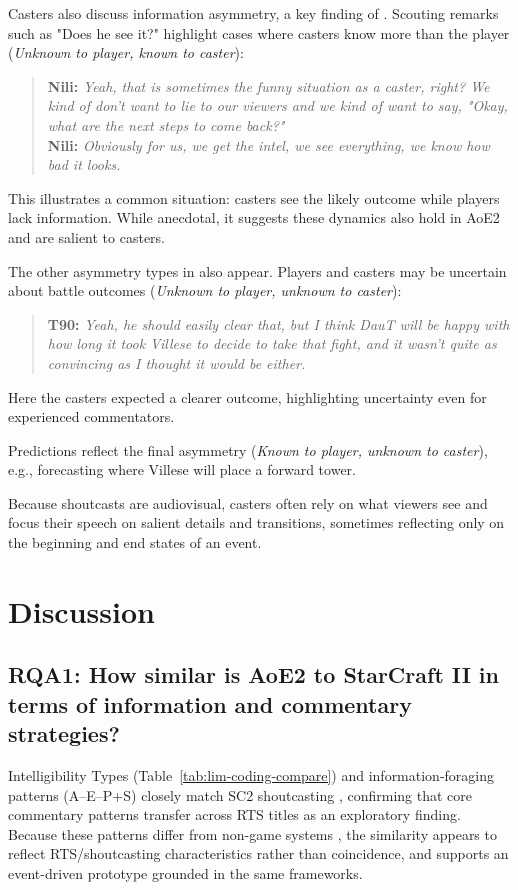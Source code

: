 Casters also discuss information asymmetry, a key finding of \citet{cheung2011starcraft}. Scouting remarks such as "Does he see it?" highlight cases where casters know more than the player (\textit{Unknown to player, known to caster}):
\begin{quote}
  \textbf{Nili:} \textit{Yeah, that is sometimes the funny situation as a caster, right? We kind of don’t want to lie to our viewers and we kind of want to say, "Okay, what are the next steps to come back?"}\\
  \textbf{Nili:} \textit{Obviously for us, we get the intel, we see everything, we know how bad it looks.}
\end{quote}

This illustrates a common situation: casters see the likely outcome while players lack information. While anecdotal, it suggests these dynamics also hold in AoE2 and are salient to casters.

The other asymmetry types in \citet{cheung2011starcraft} also appear. Players and casters may be uncertain about battle outcomes (\textit{Unknown to player, unknown to caster}):

\begin{quote}
  \textbf{T90:} \textit{Yeah, he should easily clear that, but I think DauT will be happy with how long it took Villese to decide to take that fight, and it wasn’t quite as convincing as I thought it would be either.}
\end{quote}
Here the casters expected a clearer outcome, highlighting uncertainty even for experienced commentators.

Predictions reflect the final asymmetry (\textit{Known to player, unknown to caster}), e.g., forecasting where Villese will place a forward tower.

Because shoutcasts are audiovisual, casters often rely on what viewers see and focus their speech on salient details and transitions, sometimes reflecting only on the beginning and end states of an event.

\section{Discussion}

\subsection{\textbf{RQA1:} How similar is AoE2 to StarCraft II in terms of information and commentary strategies?}
Intelligibility Types (Table~\ref{tab:lim-coding-compare}) and information-foraging patterns (A--E--P+S) closely match SC2 shoutcasting \cite{dodge2018}, confirming that core commentary patterns transfer across RTS titles as an exploratory finding. Because these patterns differ from non-game systems \cite{lim2009}, the similarity appears to reflect RTS/shoutcasting characteristics rather than coincidence, and supports an event-driven prototype grounded in the same frameworks.

